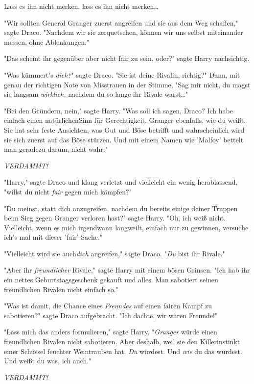 {Lass es ihn nicht merken, lass es ihn nicht merken…

"Wir sollten General Granger zuerst angreifen und sie aus dem Weg schaffen," sagte Draco. "Nachdem wir sie zerquetschen, können wir uns selbst miteinander messen, ohne Ablenkungen."

"Das scheint ihr gegenüber aber nicht fair zu sein, oder?" sagte Harry nachsichtig.

"Was kümmert's \emph{dich?}" sagte Draco. "Sie ist deine Rivalin, richtig?" Dann, mit genau der richtigen Note von Misstrauen in der Stimme, "Sag mir nicht, du magst sie langsam \emph{wirklich,} nachdem du so lange ihr Rivale warst…"

"Bei den Gründern, nein," sagte Harry. "Was soll ich sagen, Draco? Ich habe einfach einen natürlichenSinn für Gerechtigkeit. Granger ebenfalls, wie du weißt. Sie hat sehr feste Ansichten, was Gut und Böse betrifft und wahrscheinlich wird sie sich zuerst auf das Böse stürzen. Und mit einem Namen wie 'Malfoy' bettelt man geradezu darum, nicht wahr."

\emph{VERDAMMT!}

"Harry," sagte Draco und klang verletzt und vielleicht ein wenig herablassend, "willst du nicht \emph{fair} gegen mich kämpfen?"

"Du meinst, statt dich anzugreifen, nachdem du bereits einige deiner Truppen beim Sieg gegen Granger verloren hast?" sagte Harry. "Oh, ich weiß nicht. Vielleicht, wenn es mich irgendwann langweilt, einfach nur zu gewinnen, versuche ich's mal mit dieser 'fair'-Sache."

"Vielleicht wird sie auch\emph{dich} angreifen," sagte Draco. "\emph{Du} bist ihr Rivale."

"Aber ihr \emph{freundlicher} Rivale," sagte Harry mit einem bösen Grinsen. "Ich hab ihr ein nettes Geburtstagsgeschenk gekauft und alles. Man sabotiert seinen freundlichen Rivalen nicht einfach so."

"Was ist damit, die Chance eines \emph{Freundes} auf einen fairen Kampf zu sabotieren?" sagte Draco aufgebracht. "Ich dachte, wir wären Freunde!"

"Lass mich das anders formulieren," sagte Harry. "\emph{Granger} würde einen freundlichen Rivalen nicht sabotieren. Aber deshalb, weil sie den Killerinstinkt einer Schüssel feuchter Weintrauben hat. \emph{Du} würdest. Und \emph{wie} du das würdest. Und weißt du was, ich auch."

\emph{VERDAMMT!}

\later

}
